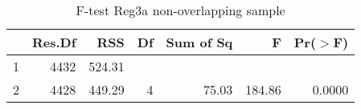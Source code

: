 \begin{table}[htbp!]
\centering
\caption{F-test Reg3a non-overlapping sample} 
\begin{tabular}{lrrrrrr}
  \hline
 & Res.Df & RSS & Df & Sum of Sq & F & Pr($>$F) \\ 
  \hline
1 & 4432 & 524.31 &  &  &  &  \\ 
  2 & 4428 & 449.29 & 4 & 75.03 & 184.86 & 0.0000 \\ 
   \hline
\end{tabular}
\end{table}
